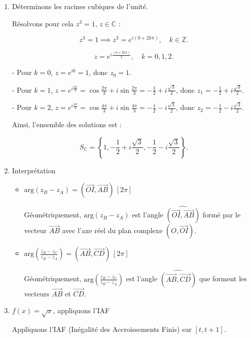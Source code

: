 \documentclass[12pt,a4paper]{article}
\begin{document}
\begin{enumerate}

\item Déterminons les racines cubiques de l'unité.

Résolvons pour cela $z^3 = 1$, $z \in \mathbb{C}$ :

\[
z^3 = 1 \implies z^3 = e^{i(0+2k\pi)}, \quad k \in \mathbb{Z}.
\]

\[
z = e^{i\frac{(0+2k\pi)}{3}}, \quad k = 0, 1, 2.
\]

- Pour $k = 0$, $z = e^{i0} = 1$, donc $z_0 = 1$.

- Pour $k = 1$, $z = e^{i\frac{2\pi}{3}} = \cos\frac{2\pi}{3} + i\sin\frac{2\pi}{3} = -\frac{1}{2} + i\frac{\sqrt{3}}{2}$, donc $z_1 = -\frac{1}{2} + i\frac{\sqrt{3}}{2}$.

- Pour $k = 2$, $z = e^{i\frac{4\pi}{3}} = \cos\frac{4\pi}{3} + i\sin\frac{4\pi}{3} = -\frac{1}{2} - i\frac{\sqrt{3}}{2}$, donc $z_2 = -\frac{1}{2} - i\frac{\sqrt{3}}{2}$.

Ainsi, l'ensemble des solutions est :

\[
S_{\mathbb{C}} = \left\{ 1, -\frac{1}{2} + i\frac{\sqrt{3}}{2}, -\frac{1}{2} - i\frac{\sqrt{3}}{2} \right\}.
\]

\item Interprétation

\begin{itemize}
    \item $\text{arg}(z_B - z_A) = (\overrightarrow{OI}, \overrightarrow{AB}) \, [2\pi]$
    
    Géométriquement, $\text{arg}(z_B - z_A)$ est l'angle $\widehat{(\overrightarrow{OI}, \overrightarrow{AB})}$ formé par le vecteur $\overrightarrow{AB}$ avec l'axe réel du plan complexe $(O, \overrightarrow{OI})$.

    \item $\text{arg}\left(\frac{z_B - z_C}{z_B - z_A}\right) = (\overrightarrow{AB}, \overrightarrow{CD}) \, [2\pi]$
    
    Géométriquement, $\text{arg}\left(\frac{z_B - z_C}{z_B - z_A}\right)$ est l'angle $\widehat{(\overrightarrow{AB}, \overrightarrow{CD})}$ que forment les vecteurs $\overrightarrow{AB}$ et $\overrightarrow{CD}$.
\end{itemize}

\item $f(x) = \sqrt{x}$, appliquons l'IAF

Appliquons l'IAF (Inégalité des Accroissements Finis) sur $[t, t+1]$.


\end{enumerate}
\end{document}
